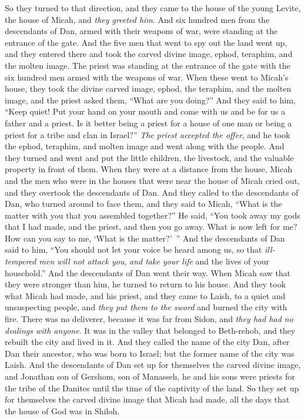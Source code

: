 \begin{biblechapter}
\verse So they turned to that direction, and they came to the house of the young Levite, the house of Micah, and \textit{they greeted him}.
\verse And six hundred men from the descendants of Dan, armed with their weapons of war, were standing at the entrance of the gate.
\verse And the five men that went to spy out the land went up, and they entered there and took the carved divine image, ephod, teraphim, and the molten image. The priest was standing at the entrance of the gate with the six hundred men armed with the weapons of war.
\verse When these went to Micah’s house, they took the divine carved image, ephod, the teraphim, and the molten image, and the priest asked them, “What are you doing?”
\verse And they said to him, “Keep quiet! Put your hand on your mouth and come with us and be for us a father and a priest. Is it better being a priest for a house of one man or being a priest for a tribe and clan in Israel?”
\verse \textit{The priest accepted the offer}, and he took the ephod, teraphim, and molten image and went along with the people.
\verse And they turned and went and put the little children, the livestock, and the valuable property in front of them.
\verse When they were at a distance from the house, Micah and the men who were in the houses that were near the house of Micah cried out, and they overtook the descendants of Dan.
\verse And they called to the descendants of Dan, who turned around to face them, and they said to Micah, “What is the matter with you that you assembled together?”
\verse He said, “You took away my gods that I had made, and the priest, and then you go away. What is now left for me? How can you say to me, ‘What is the matter?’ ”
\verse And the descendants of Dan said to him, “You should not let your voice be heard among us, so that \textit{ill-tempered men} \textit{will not attack you}, \textit{and take your life} and the lives of your household.”
\verse And the descendants of Dan went their way. When Micah saw that they were stronger than him, he turned to return to his house.
\verse And they took what Micah had made, and his priest, and they came to Laish, to a quiet and unsuspecting people, and \textit{they put them to the sword} and burned the city with fire.
\verse There was no deliverer, because it was far from Sidon, and \textit{they had had no dealings with anyone}. It was in the valley that belonged to Beth-rehob, and they rebuilt the city and lived in it.
\verse And they called the name of the city Dan, after Dan their ancestor, who was born to Israel; but the former name of the city was Laish.
\verse And the descendants of Dan set up for themselves the carved divine image, and Jonathan son of Gershom, son of Manasseh, he and his sons were priests for the tribe of the Danites until the time of the captivity of the land.
\verse So they set up for themselves the carved divine image that Micah had made, all the days that the house of God was in Shiloh.
\end{biblechapter}

